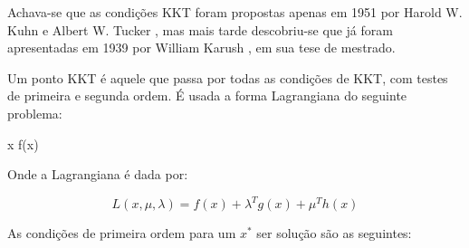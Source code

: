 Achava-se que as condições KKT foram propostas apenas em 1951 por Harold W. Kuhn e Albert W.
Tucker \cite{kuhn1951nonlinear}, mas mais tarde descobriu-se que já foram apresentadas em
1939 por William Karush \cite{karush1939minima}, em sua tese de mestrado.

Um ponto KKT é aquele que passa por todas as condições de KKT, com testes de primeira e segunda
ordem. É usada a forma Lagrangiana do seguinte problema:


\vspace{-15pt}
\begin{mini!}
{x}{ f(x) \label{kkt_obj}}{\label{prob_kkt}}{}
\end{mini!}

Onde a Lagrangiana é dada por:

\begin{equation}
  \label{fn_lagrangiana}
  L(x, \mu, \lambda) = f(x) + \lambda^T g(x) + \mu^T h(x)
\end{equation}

As condições de primeira ordem para um \(x^*\) ser solução são as seguintes:

